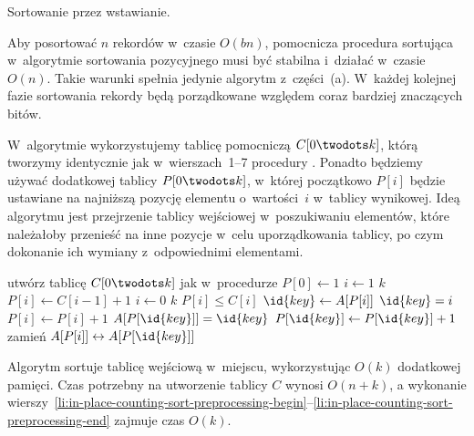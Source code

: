 \subproblem %
Sortowanie przez wstawianie.

\subproblem %
Aby posortować $n$ rekordów  w~czasie $O(bn)$, pomocnicza procedura sortująca w~algorytmie sortowania pozycyjnego musi być stabilna i~działać w~czasie $O(n)$. Takie warunki spełnia jedynie algorytm z~części~(a). W~każdej kolejnej fazie sortowania rekordy będą porządkowane względem coraz bardziej znaczących bitów.

\subproblem %
W~algorytmie wykorzystujemy tablicę pomocniczą $C[0\twodots k]$, którą tworzymy identycznie jak w~wierszach~1\nobreakdash--7 procedury . Ponadto będziemy używać dodatkowej tablicy $P[0\twodots k]$, w~której początkowo $P[i]$ będzie ustawiane na najniższą pozycję elementu o~wartości~$i$ w~tablicy wynikowej. Ideą algorytmu jest przejrzenie tablicy wejściowej w~poszukiwaniu elementów, które należałoby przenieść na inne pozycje w~celu uporządkowania tablicy, po czym dokonanie ich wymiany z~odpowiednimi elementami.
\begin{codebox}
\li	utwórz tablicę $C[0\twodots k]$ jak w~procedurze  
\li	$P[0]\gets1$ \label{li:in-place-counting-sort-preprocessing-begin}
\li	\For $i\gets1$ \To $k$
\li		\Do $P[i]\gets C[i-1]+1$
		\End \label{li:in-place-counting-sort-preprocessing-end}
\li	\For $i\gets0$ \To $k$ \label{li:in-place-counting-sort-for-begin}
\li		\Do
			\While $P[i]\le C[i]$ \label{li:in-place-counting-sort-while-begin}
\li				\Do
					$\id{key}\gets A[P[i]]$
\li					\If $\id{key}=i$
\li						\Then $P[i]\gets P[i]+1$ \label{li:in-place-counting-sort-increment}
\li						\Else
							\While $A[P[\id{key}]]=\id{key}$
\li								\Do $P[\id{key}]\gets P[\id{key}]+1$
								\End
\li							zamień $A[P[i]]\leftrightarrow A[P[\id{key}]]$ \label{li:in-place-counting-sort-swap}
						\End
				\End \label{li:in-place-counting-sort-while-end}
		\End \label{li:in-place-counting-sort-for-end}
\end{codebox}

Algorytm sortuje tablicę wejściową w~miejscu, wykorzystując $O(k)$ dodatkowej pamięci. Czas potrzebny na utworzenie tablicy $C$ wynosi $O(n+k)$, a wykonanie wierszy~\ref{li:in-place-counting-sort-preprocessing-begin}\nobreakdash--\ref{li:in-place-counting-sort-preprocessing-end} zajmuje czas $O(k)$.

